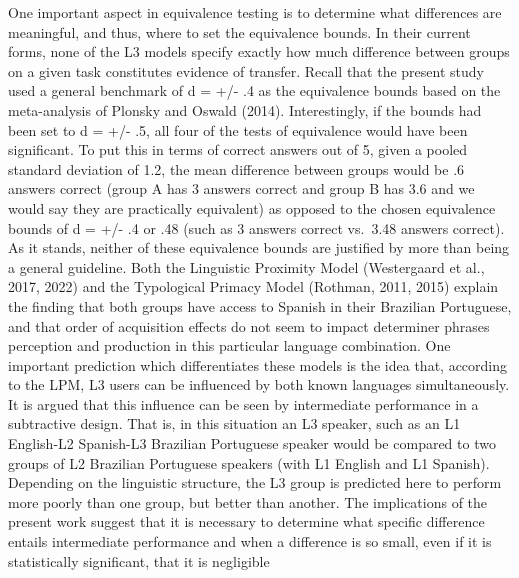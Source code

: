 \documentclass[
  man,floatsintext]{apa6}
\begin{document}
One important aspect in equivalence testing is to determine what differences are meaningful, and thus, where to set the equivalence bounds.
In their current forms, none of the L3 models specify exactly how much difference between groups on a given task constitutes evidence of transfer.
Recall that the present study used a general benchmark of d = +/- .4 as the equivalence bounds based on the meta-analysis of Plonsky and Oswald (2014).
Interestingly, if the bounds had been set to d = +/- .5, all four of the tests of equivalence would have been significant.
To put this in terms of correct answers out of 5, given a pooled standard deviation of 1.2, the mean difference between groups would be .6 answers correct (group A has 3 answers correct and group B has 3.6 and we would say they are practically equivalent) as opposed to the chosen equivalence bounds of d = +/- .4 or .48 (such as 3 answers correct vs.~3.48 answers correct).
As it stands, neither of these equivalence bounds are justified by more than being a general guideline.
Both the Linguistic Proximity Model (Westergaard et al., 2017, 2022) and the Typological Primacy Model (Rothman, 2011, 2015) explain the finding that both groups have access to Spanish in their Brazilian Portuguese, and that order of acquisition effects do not seem to impact determiner phrases perception and production in this particular language combination.
One important prediction which differentiates these models is the idea that, according to the LPM, L3 users can be influenced by both known languages simultaneously.
It is argued that this influence can be seen by intermediate performance in a subtractive design.
That is, in this situation an L3 speaker, such as an L1 English-L2 Spanish-L3 Brazilian Portuguese speaker would be compared to two groups of L2 Brazilian Portuguese speakers (with L1 English and L1 Spanish).
Depending on the linguistic structure, the L3 group is predicted here to perform more poorly than one group, but better than another.
The implications of the present work suggest that it is necessary to determine what specific difference entails intermediate performance and when a difference is so small, even if it is statistically significant, that it is negligible
\end{document}
